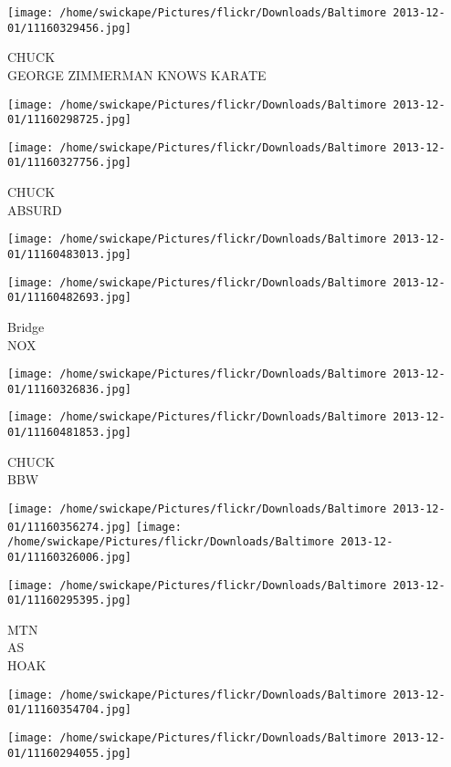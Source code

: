 \documentclass[10pt,letterpaper]{article}
\begin{document}
\vspace{0.25in}
\texttt{[image: /home/swickape/Pictures/flickr/Downloads/Baltimore 2013-12-01/11160329456.jpg]}

CHUCK\\
GEORGE ZIMMERMAN KNOWS KARATE
\pagebreak

\texttt{[image: /home/swickape/Pictures/flickr/Downloads/Baltimore 2013-12-01/11160298725.jpg]}

\vspace{0.25in}
\texttt{[image: /home/swickape/Pictures/flickr/Downloads/Baltimore 2013-12-01/11160327756.jpg]}

CHUCK\\
ABSURD
\pagebreak

\texttt{[image: /home/swickape/Pictures/flickr/Downloads/Baltimore 2013-12-01/11160483013.jpg]}

\vspace{0.25in}
\texttt{[image: /home/swickape/Pictures/flickr/Downloads/Baltimore 2013-12-01/11160482693.jpg]}

Bridge\\
NOX
\pagebreak

\texttt{[image: /home/swickape/Pictures/flickr/Downloads/Baltimore 2013-12-01/11160326836.jpg]}

\vspace{0.25in}
\texttt{[image: /home/swickape/Pictures/flickr/Downloads/Baltimore 2013-12-01/11160481853.jpg]}

CHUCK\\
BBW
\pagebreak

\texttt{[image: /home/swickape/Pictures/flickr/Downloads/Baltimore 2013-12-01/11160356274.jpg]}
\texttt{[image: /home/swickape/Pictures/flickr/Downloads/Baltimore 2013-12-01/11160326006.jpg]}

\texttt{[image: /home/swickape/Pictures/flickr/Downloads/Baltimore 2013-12-01/11160295395.jpg]}

MTN\\
AS\\
HOAK
\pagebreak

\texttt{[image: /home/swickape/Pictures/flickr/Downloads/Baltimore 2013-12-01/11160354704.jpg]}

\vspace{0.25in}
\texttt{[image: /home/swickape/Pictures/flickr/Downloads/Baltimore 2013-12-01/11160294055.jpg]}
\end{document}
